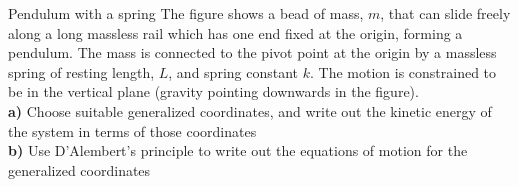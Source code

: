 \begin{problem}{Pendulum with a spring}
\label{prob_VirtWork_7}
The figure shows a bead of mass, $m$, that can slide freely along a long massless rail which has one end fixed at the origin, forming a pendulum. The mass is connected to the pivot point at the origin by a massless spring of resting length, $L$, and spring constant $k$. The motion is constrained to be in the vertical plane (gravity pointing downwards in the figure).
\\
\textbf{a)} Choose suitable generalized coordinates, and write out the kinetic energy of the system in terms of those coordinates\\
\textbf{b)} Use D'Alembert's principle to write out the equations of motion for the generalized coordinates
\end{problem}

